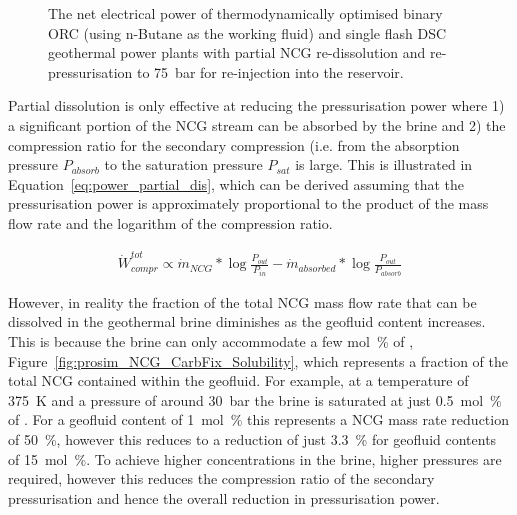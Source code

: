         \begin{figure}[H]
            \centering
            
            \caption[The net electrical power of thermodynamically optimised binary \ac{ORC} and single flash \ac{DSC} geothermal power plants partially dissolving and re-injecting \ac{NCG} into the reservoir.]{The net electrical power of thermodynamically optimised binary \ac{ORC} (using n-Butane as the working fluid) and single flash \ac{DSC} geothermal power plants with partial \ac{NCG} re-dissolution and re-pressurisation to \qty{75}{\bar} for re-injection into the reservoir.}
            \label{fig:prosim_NCG_CarbFix_Wnet}
        \end{figure}

        Partial dissolution is only effective at reducing the pressurisation power where 1) a significant portion of the \ac{NCG} stream can be absorbed by the brine and 2) the compression ratio for the secondary compression (i.e. from the absorption pressure \(P_{absorb}\) to the saturation pressure \(P_{sat}\) is large. This is illustrated in Equation~\ref{eq:power_partial_dis}, which can be derived assuming that the pressurisation power is approximately proportional to the product of the mass flow rate and the logarithm of the compression ratio.

        \begin{align}
            \Dot{W}_{compr}^{tot} \propto \Dot{m}_{NCG} * \log \frac{P_{out}}{P_{in}} - \Dot{m}_{absorbed} * \log \frac{P_{out}}{P_{absorb}} \label{eq:power_partial_dis}
        \end{align}

        However, in reality the fraction of the total \ac{NCG} mass flow rate that can be dissolved in the geothermal brine diminishes as the geofluid  content increases. This is because the brine can only accommodate a few \unit{\mol\percent} of , Figure~\ref{fig:prosim_NCG_CarbFix_Solubility}, which represents a fraction of the total \ac{NCG} contained within the geofluid. For example, at a temperature of \qty{375}{\K} and a pressure of around \qty{30}{\bar} the brine is saturated at just \qty{0.5}{\mol\percent} of . For a geofluid  content of \qty{1}{\mol\percent} this represents a \ac{NCG} mass rate reduction of \qty{50}{\percent}, however this reduces to a reduction of just \qty{3.3}{\percent} for geofluid  contents of \qty{15}{\mol\percent}. To achieve higher  concentrations in the brine, higher pressures are required, however this reduces the compression ratio of the secondary pressurisation and hence the overall reduction in pressurisation power.
        
